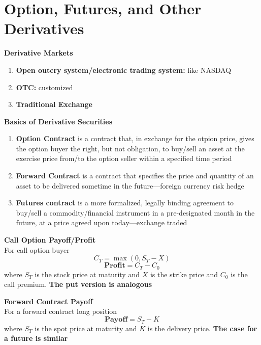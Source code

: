 \documentclass[11pt,fleqn]{book} %
\numberwithin{equation}{section} %
\numberwithin{figure}{section} %
\numberwithin{table}{section} %
\begin{document}
\chapter{Option, Futures, and Other Derivatives}
\begin{definition}\textbf{Derivative Markets}
\begin{enumerate}
    \item \textbf{Open outcry system/electronic trading system:} like NASDAQ
    \item \textbf{OTC:} customized
    \item \textbf{Traditional Exchange}
\end{enumerate}
\end{definition}
\begin{definition}\textbf{Basics of Derivative Securities}
\begin{enumerate}
    \item \textbf{Option Contract} is a contract that, in exchange for the otpion price, gives the option buyer the right, but not obligation, to buy/sell an asset at the exercise price from/to the option seller within a specified time period
    \item \textbf{Forward Contract} is a contract that specifies the price and quantity of an asset to be delivered sometime in the future---foreign currency risk hedge
    \item \textbf{Futures contract} is a more formalized, legally binding agreement to buy/sell a commodity/financial instrument in a pre-designated month in the future, at a price agreed upon today---exchange traded
\end{enumerate}
\end{definition}
\begin{theorem}\textbf{Call Option Payoff/Profit}\\
For call option buyer
$$
C_T=\max(0,S_T-X)
$$
$$
\textbf{Profit}=C_T-C_0
$$
where $S_T$ is the stock price at maturity and $X$ is the strike price and $C_0$ is the call premium. \textbf{The put version is analogous}
\end{theorem}
\begin{theorem}\textbf{Forward Contract Payoff}\\
For a forward contract long position
$$
\textbf{Payoff}=S_T-K
$$
where $S_T$ is the spot price at maturity and $K$ is the delivery price. \textbf{The case for a future is similar}
\end{theorem}
\end{document}
